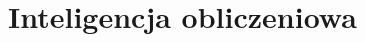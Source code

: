 \documentclass[wi]{zut}
\begin{document}





\section{Inteligencja obliczeniowa}




\end{document}
